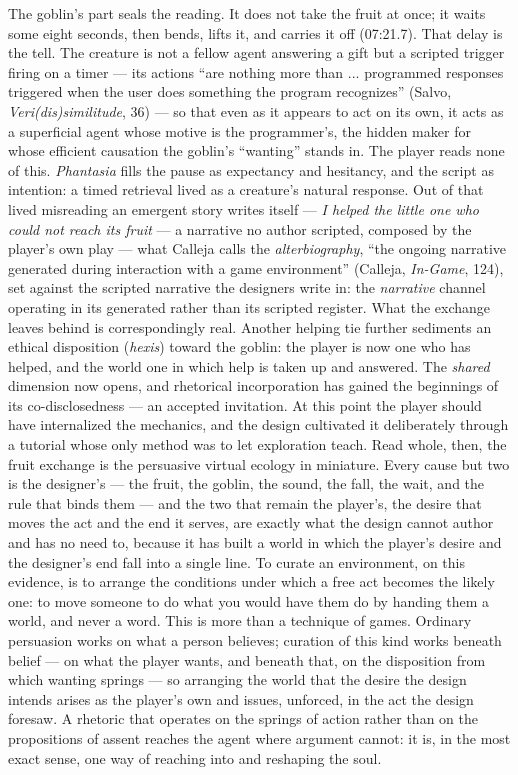 \documentclass{article}
\begin{document}
The goblin's part seals the reading. It does not take the fruit at once; it waits some eight seconds, then bends, lifts it, and carries it off (07:21.7). That delay is the tell. The creature is not a fellow agent answering a gift but a scripted trigger firing on a timer — its actions ``are nothing more than ... programmed responses triggered when the user does something the program recognizes'' (Salvo, \textit{Veri(dis)similitude}, 36) — so that even as it appears to act on its own, it acts as a superficial agent whose motive is the programmer's, the hidden maker for whose efficient causation the goblin's ``wanting'' stands in. The player reads none of this. \textit{Phantasia} fills the pause as expectancy and hesitancy, and the script as intention: a timed retrieval lived as a creature's natural response. Out of that lived misreading an emergent story writes itself — \textit{I helped the little one who could not reach its fruit} — a narrative no author scripted, composed by the player's own play — what Calleja calls the \textit{alterbiography}, ``the ongoing narrative generated during interaction with a game environment'' (Calleja, \textit{In-Game}, 124), set against the scripted narrative the designers write in: the \textit{narrative} channel operating in its generated rather than its scripted register. What the exchange leaves behind is correspondingly real. Another helping tie further sediments an ethical disposition (\textit{hexis}) toward the goblin: the player is now one who has helped, and the world one in which help is taken up and answered. The \textit{shared} dimension now opens, and rhetorical incorporation has gained the beginnings of its co-disclosedness — an accepted invitation. At this point the player should have internalized the mechanics, and the design cultivated it deliberately through a tutorial whose only method was to let exploration teach. Read whole, then, the fruit exchange is the persuasive virtual ecology in miniature. Every cause but two is the designer's — the fruit, the goblin, the sound, the fall, the wait, and the rule that binds them — and the two that remain the player's, the desire that moves the act and the end it serves, are exactly what the design cannot author and has no need to, because it has built a world in which the player's desire and the designer's end fall into a single line. To curate an environment, on this evidence, is to arrange the conditions under which a free act becomes the likely one: to move someone to do what you would have them do by handing them a world, and never a word. This is more than a technique of games. Ordinary persuasion works on what a person believes; curation of this kind works beneath belief — on what the player wants, and beneath that, on the disposition from which wanting springs — so arranging the world that the desire the design intends arises as the player's own and issues, unforced, in the act the design foresaw. A rhetoric that operates on the springs of action rather than on the propositions of assent reaches the agent where argument cannot: it is, in the most exact sense, one way of reaching into and reshaping the soul.
\end{document}
